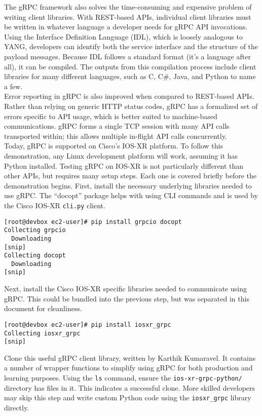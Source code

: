 The gRPC framework also solves the time-consuming and expensive problem of
writing client libraries. With REST-based APIs, individual client libraries
must be written in whatever language a developer needs for gRPC API
invocations. Using the Interface Definition Language (IDL), which is loosely
analogous to YANG, developers can identify both the service interface and the
structure of the payload messages. Because IDL follows a standard format (it's
a language after all), it can be compiled. The outputs from this compilation
process include client libraries for many different languages, such as C, C\#,
Java, and Python to name a few. \\

Error reporting in gRPC is also improved when compared to REST-based APIs.
Rather than relying on generic HTTP status codes, gRPC has a formalized set of
errors specific to API usage, which is better suited to machine-based
communications. gRPC forms a single TCP session with many API calls
transported within; this allows multiple in-flight API calls concurrently. \\

Today, gRPC is supported on Cisco's IOS-XR platform. To follow this
demonstration, any Linux development platform will work, assuming it has
Python installed. Testing gRPC on IOS-XR is not particularly different than
other APIs, but requires many setup steps. Each one is covered briefly before
the demonstration begins. First, install the necessary underlying libraries
needed to use gRPC\@. The ``docopt'' package helps with using CLI commands and is
used by the Cisco IOS-XR \verb|cli.py| client. \\

\begin{verbatim}
[root@devbox ec2-user]# pip install grpcio docopt
Collecting grpcio
  Downloading
[snip]
Collecting docopt
  Downloading
[snip]
\end{verbatim}

Next, install the Cisco IOS-XR specific libraries needed to communicate using
gRPC\@. This could be bundled into the previous step, but was separated in this
document for cleanliness.

\begin{verbatim}
[root@devbox ec2-user]# pip install iosxr_grpc
Collecting iosxr_grpc
[snip]
\end{verbatim}

Clone this useful gRPC client library, written by Karthik Kumaravel. It
contains a number of wrapper functions to simplify using gRPC for both
production and learning purposes. Using the \verb|ls| command, ensure the
\verb|ios-xr-grpc-python/| directory has files in it. This indicates a successful
clone. More skilled developers may skip this step and write custom Python code
using the \verb|iosxr_grpc| library directly.

